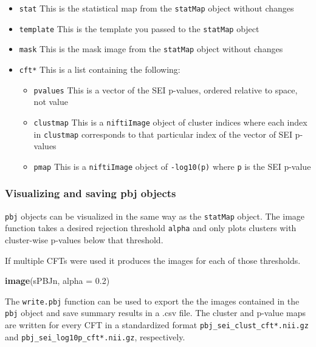 \documentclass[]{article}
\newenvironment{Shaded}{\begin{snugshade}}{\end{snugshade}}
\newcommand{\DataTypeTok}[1]{\textcolor[rgb]{0.13,0.29,0.53}{#1}}
\newcommand{\FloatTok}[1]{\textcolor[rgb]{0.00,0.00,0.81}{#1}}
\newcommand{\KeywordTok}[1]{\textcolor[rgb]{0.13,0.29,0.53}{\textbf{#1}}}
\newcommand{\NormalTok}[1]{#1}
\providecommand{\tightlist}{%
  \setlength{\itemsep}{0pt}\setlength{\parskip}{0pt}}
\begin{document}
\begin{itemize}
\tightlist
\item
  \texttt{stat} This is the statistical map from the \texttt{statMap}
  object without changes
\item
  \texttt{template} This is the template you passed to the
  \texttt{statMap} object
\item
  \texttt{mask} This is the mask image from the \texttt{statMap} object
  without changes
\item
  \texttt{cft*} This is a list containing the following:

  \begin{itemize}
  \tightlist
  \item
    \texttt{pvalues} This is a vector of the SEI p-values, ordered
    relative to space, not value
  \item
    \texttt{clustmap} This is a \texttt{niftiImage} object of cluster
    indices where each index in \texttt{clustmap} corresponds to that
    particular index of the vector of SEI p-values
  \item
    \texttt{pmap} This is a \texttt{niftiImage} object of
    \texttt{-log10(p)} where \texttt{p} is the SEI p-value
  \end{itemize}
\end{itemize}

\hypertarget{visualizing-and-saving-pbj-objects}{%
\subsubsection{Visualizing and saving pbj
objects}\label{visualizing-and-saving-pbj-objects}}

\texttt{pbj} objects can be visualized in the same way as the
\texttt{statMap} object. The image function takes a desired rejection
threshold \texttt{alpha} and only plots clusters with cluster-wise
p-values below that threshold.

If multiple CFTs were used it produces the images for each of those
thresholds.

\begin{Shaded}
\begin{Highlighting}[]
\KeywordTok{image}\NormalTok{(sPBJn, }\DataTypeTok{alpha =} \FloatTok{0.2}\NormalTok{)}
\end{Highlighting}
\end{Shaded}

The \texttt{write.pbj} function can be used to export the the images
contained in the \texttt{pbj} object and save summary results in a .csv
file. The cluster and p-value maps are written for every CFT in a
standardized format \texttt{pbj\_sei\_clust\_cft*.nii.gz} and
\texttt{pbj\_sei\_log10p\_cft*.nii.gz}, respectively.
\end{document}
